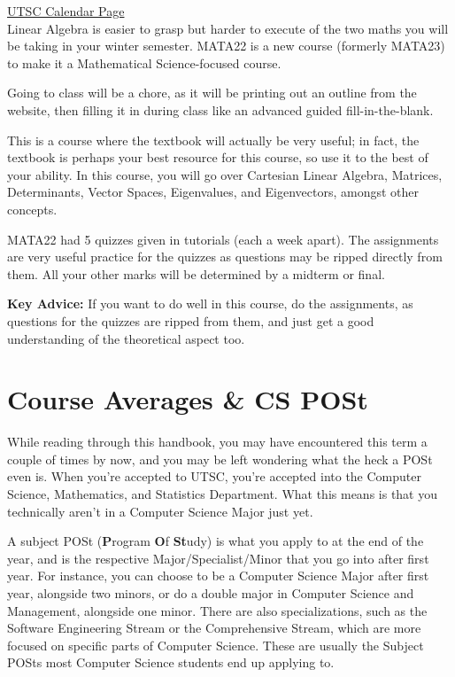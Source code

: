 \documentclass[11pt]{article}
\begin{document}
\href{https://utsc.calendar.utoronto.ca/course/MATA22H3}{UTSC Calendar Page}\\

Linear Algebra is easier to grasp but harder to execute of the two maths
you will be taking in your winter semester. MATA22 is a new course
(formerly MATA23) to make it a Mathematical Science-focused course.

Going to class will be a chore, as it will be printing out an outline
from the website, then filling it in during class like an advanced
guided fill-in-the-blank.

This is a course where the textbook will actually be very useful; in
fact, the textbook is perhaps your best resource for this course,
so use it to the best of your ability. In this course, you will go
over Cartesian Linear Algebra, Matrices, Determinants, Vector Spaces,
Eigenvalues, and Eigenvectors, amongst other concepts.

MATA22 had 5 quizzes given in tutorials (each a week apart). The
assignments are very useful practice for the quizzes as questions may be
ripped directly from them. All your other marks will be determined by a
midterm or final.

\textbf{Key Advice:}
If you want to do well in this course, do the assignments, as questions
for the quizzes are ripped from them, and just get a good understanding
of the theoretical aspect too.

\section{Course Averages \& CS POSt}
While reading through this handbook, you may have encountered this term
a couple of times by now, and you may be left wondering what the heck
a POSt even is. When you're accepted to UTSC, you're accepted into the
Computer Science, Mathematics, and Statistics Department. What this
means is that you technically aren't in a Computer Science Major just
yet.

A subject POSt (\textbf{P}rogram \textbf{O}f \textbf{St}udy) is
what you apply to at the end of the year, and is the respective
Major/Specialist/Minor that you go into after first year. For instance,
you can choose to be a Computer Science Major after first year,
alongside two minors, or do a double major in Computer Science and
Management, alongside one minor. There are also specializations, such as
the Software Engineering Stream or the Comprehensive Stream, which are
more focused on specific parts of Computer Science. These are usually
the Subject POSts most Computer Science students end up applying to.
\end{document}
